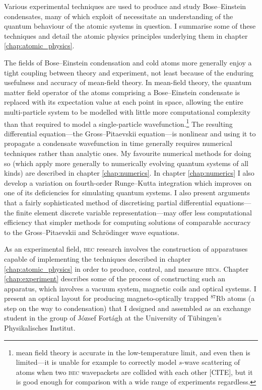 Various experimental techniques are used to produce and study Bose--Einstein condensates, many of which exploit of necessitate an understanding of the quantum behaviour of the atomic systems in question. I summarise some of these techniques and detail the atomic physics principles underlying them in chapter \ref{chap:atomic_physics}.

The fields of Bose--Einstein condensation and cold atoms more generally enjoy a tight coupling between theory and experiment, not least because of the enduring usefulness and accuracy of mean-field theory. In mean-field theory, the quantum matter field operator of the atoms comprising a Bose--Einstein condensate is replaced with its expectation value at each point in space, allowing the entire multi-particle system to be modelled with little more computational complexity than that required to model a single-particle wavefunction.\footnote{mean field theory is accurate in the low-temperature limit, and even then is limited---it is unable for example to correctly model $s$-wave scattering of atoms when two \textsc{bec} wavepackets are collided with each other [CITE], but it is good enough for comparison with a wide range of experiments regardless.} The resulting differential equation---the Gross--Pitaevskii equation---is nonlinear and using it to propagate a condensate wavefunction in time generally requires numerical techniques rather than analytic ones. My favourite numerical methods for doing so (which apply more generally to numerically evolving quantum systems of all kinds) are described in chapter \ref{chap:numerics}. In chapter \ref{chap:numerics} I also develop a variation on fourth-order Runge--Kutta integration which improves on one of its deficiencies for simulating quantum systems. I also present arguments that a fairly sophisticated method of discretising partial differential equations---the finite element discrete variable representation---may offer less computational efficiency that simpler methods for computing solutions of comparable accuracy to the Gross--Pitaevskii and Schr\"odinger wave equations.

As an experimental field, \textsc{bec} research involves the construction of apparatuses capable of implementing the techniques described in chapter \ref{chap:atomic_physics} in order to produce, control, and measure \textsc{bec}s. Chapter \ref{chap:experiment} describes some of the process of constructing such an apparatus, which involves a vacuum system, magnetic coils and optical systems. I present an optical layout for producing magneto-optically trapped $^{87}$Rb atoms (a step on the way to condensation) that I designed and assembled as an exchange student in the group of József Fortágh at the University of T\"ubingen's Physikalisches Institut.

